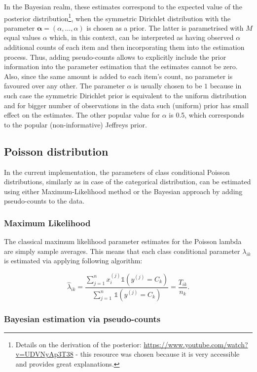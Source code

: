 \documentclass{article}\usepackage[]{graphicx}\usepackage[]{color}
\begin{document}
In the Bayesian realm, these estimates correspond to the expected value of the posterior distribution\footnote{Details on the derivation of the posterior: \url{https://www.youtube.com/watch?v=UDVNyAp3T38} - this resource was chosen because it is very accessible and provides great explanations.}, when the symmetric Dirichlet distribution with the parameter $\boldsymbol{\alpha} = (\alpha,...,\alpha)$ is chosen as a prior. The latter is parametrised with $M$ equal values $\alpha$ which, in this context, can be interpreted as having observed $\alpha$ additional counts of each item and then incorporating them into the estimation process. Thus, adding pseudo-counts allows to explicitly include the prior information into the parameter estimation that the estimates cannot be zero. Also, since the same amount is added to each item's count, no parameter is favoured over any other. The parameter $\alpha$ is usually chosen to be $1$ because in such case the symmetric Dirichlet prior is equivalent to the uniform distribution and for bigger number of observations in the data such (uniform) prior has small effect on the estimates. The other popular value for $\alpha$ is 0.5, which corresponds to the popular (non-informative) Jeffreys prior.


\subsection{Poisson distribution}

In the current implementation, the parameters of class conditional Poisson distributions, similarly as in case of the categorical distribution, can be estimated using either Maximum-Likelihood method or the Bayesian approach by adding pseudo-counts to the data.


\subsubsection{Maximum Likelihood}

The classical maximum likelihood parameter estimates for the Poisson lambda are simply sample averages. This means that each class conditional parameter $\lambda_{ik}$ is estimated via applying following algorithm:

$$\hat{\lambda}_{ik} = \frac{\sum_{j=1}^n x_i^{(j)} \mathbb{1}(y^{(j)} = C_k) }{\sum_{j=1}^n \, \mathbb{1}(y^{(j)} = C_k)} = \frac{T_{ik}}{n_k}.$$


\subsubsection{Bayesian estimation via pseudo-counts}
\end{document}

